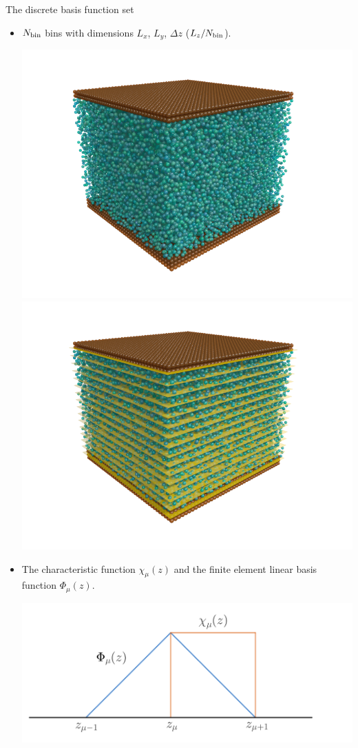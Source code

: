 \documentclass{beamer}
\begin{document}
\begin{frame}{The discrete basis function set}
  \begin{itemize}
  \item $N_{\rm bin}$ bins with dimensions $L_x$, $L_y$, $\Delta z$ ($L_z/N_{\rm bin}$). 
      \begin{center}
    \includegraphics[width=.35\linewidth]{PRL3_gold2_wo_layers_wo_diffuse}
    \includegraphics[width=.35\linewidth]{PRL3_gold2_wo_diffuse}
      \end{center}
    \item The characteristic function $\chi_\mu(z)$ and the finite element linear basis function $\Phi_\mu(z)$.
  \begin{center}
  \includegraphics[scale=0.2]{psichi}
\end{center}
\end{itemize}
\end{frame}
\end{document}
